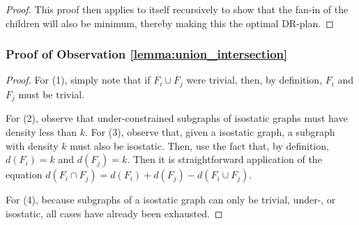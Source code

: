 \begin{proof}
This proof then applies to itself recursively to show that the fan-in of the children will also be minimum, thereby making this the optimal DR-plan.
\end{proof}


\subsubsection{Proof of Observation \ref{lemma:union_intersection}}

\begin{proof}
For (1), simply note that if $F_i\cup F_j$ were trivial, then, by definition, $F_i$ and $F_j$ must be trivial.

For (2), observe that under-constrained subgraphs of isostatic graphs must have density less than $k$. For (3), observe that, given a isostatic graph, a subgraph with density $k$ must also be isostatic. Then, use the fact that, by definition, $d(F_i)=k$ and $d(F_j)=k$. Then it is straightforward application of the equation $d(F_i\cap F_j)=d(F_i)+d(F_j)-d(F_i\cup F_j)$.

For (4), because subgraphs of a isostatic graph can only be trivial, under-, or isostatic, all cases have already been exhausted.
\end{proof}







